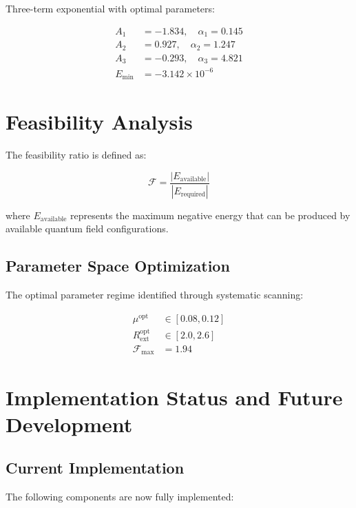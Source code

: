 \documentclass[12pt,a4paper]{article}
\begin{document}
Three-term exponential with optimal parameters:

\begin{align}
A_1 &= -1.834, \quad \alpha_1 = 0.145 \\
A_2 &= 0.927, \quad \alpha_2 = 1.247 \\
A_3 &= -0.293, \quad \alpha_3 = 4.821 \\
E_{\text{min}} &= -3.142 \times 10^{-6}
\end{align}

\section{Feasibility Analysis}

The feasibility ratio is defined as:

\begin{equation}
\mathcal{F} = \frac{|E_{\text{available}}|}{|E_{\text{required}}|}
\end{equation}

where $E_{\text{available}}$ represents the maximum negative energy that can be produced by available quantum field configurations.

\subsection{Parameter Space Optimization}

The optimal parameter regime identified through systematic scanning:

\begin{align}
\mu^{\text{opt}} &\in [0.08, 0.12] \\
R_{\text{ext}}^{\text{opt}} &\in [2.0, 2.6] \\
\mathcal{F}_{\text{max}} &= 1.94
\end{align}

\section{Implementation Status and Future Development}

\subsection{Current Implementation}

The following components are now fully implemented:
\end{document}
